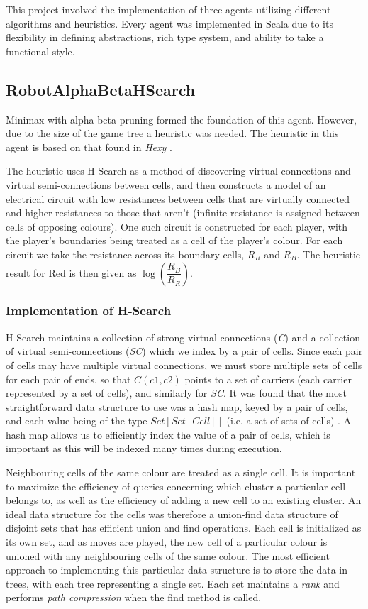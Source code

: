 This project involved the implementation of three agents utilizing different algorithms and heuristics. Every agent was implemented in Scala due to its flexibility in defining abstractions, rich type system, and ability to take a functional style.

\subsection{RobotAlphaBetaHSearch}

Minimax with alpha-beta pruning formed the foundation of this agent. However, due to the size of the game tree a heuristic was needed. The heuristic in this agent is based on that found in \textit{Hexy} \cite{HierarchicalHex}.

The heuristic uses H-Search as a method of discovering virtual connections and virtual semi-connections between cells, and then constructs a model of an electrical circuit with low resistances between cells that are virtually connected and higher resistances to those that aren't (infinite resistance is assigned between cells of opposing colours). One such circuit is constructed for each player, with the player's boundaries being treated as a cell of the player's colour. For each circuit we take the resistance across its boundary cells, $R_R$ and $R_B$. The heuristic result for Red is then given as $\log( \dfrac{R_B}{R_R})$.

\subsubsection{Implementation of H-Search}
H-Search maintains a collection of strong virtual connections (\textit{C}) and a collection of virtual semi-connections (\textit{SC}) \cite{HierarchicalHex} which we index by a pair of cells. Since each pair of cells may have multiple virtual connections, we must store multiple sets of cells for each pair of ends, so that \textit{$C(c1, c2)$} points to a set of carriers (each carrier represented by a set of cells), and similarly for \textit{SC}. It was found that the most straightforward data structure to use was a hash map, keyed by a pair of cells, and each value being of the type $Set[Set[Cell]]$ (i.e. a set of sets of cells) . A hash map allows us to efficiently index the value of a pair of cells, which is important as this will be indexed many times during execution.

 Neighbouring cells of the same colour are treated as a single cell. It is important to maximize the efficiency of queries concerning which cluster a particular cell belongs to, as well as the efficiency of adding a new cell to an existing cluster. An ideal data structure for the cells was therefore a union-find data structure of disjoint sets that has efficient union and find operations. Each cell is initialized as its own set, and as moves are played, the new cell of a particular colour is unioned with any neighbouring cells of the same colour. The most efficient approach to implementing this particular data structure is to store the data in trees, with each tree representing a single set. Each set maintains a \textit{rank} and performs \textit{path compression} when the find method is called.
 
